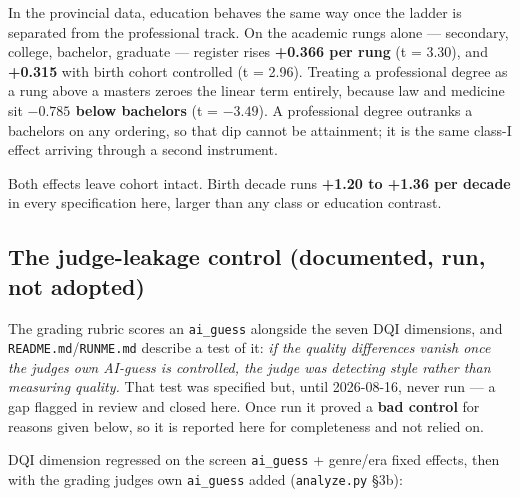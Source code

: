In the provincial data, education behaves the same way once the ladder is
separated from the professional track. On the academic rungs alone ---
secondary, college, bachelor, graduate --- register rises \textbf{+0.366 per rung}
(t = 3.30), and \textbf{+0.315} with birth cohort controlled (t = 2.96). Treating a
professional degree as a rung above a master\textquotesingle s zeroes the linear term entirely,
because law and medicine sit \textbf{\(-0.785\) below bachelor\textquotesingle s} (t = \(-3.49\)). A
professional degree outranks a bachelor\textquotesingle s on any ordering, so that dip cannot
be attainment; it is the same class-I effect arriving through a second
instrument.

Both effects leave cohort intact. Birth decade runs \textbf{+1.20 to +1.36 per
decade} in every specification here, larger than any class or education
contrast.

\subsection{The judge-leakage control (documented, run, not adopted)}\label{sec:judge-leakage}

The grading rubric scores an \texttt{ai\_guess} alongside the seven DQI dimensions,
and \texttt{README.md}/\texttt{RUNME.md} describe a test of it: \emph{if the quality differences
vanish once the judge\textquotesingle s own AI-guess is controlled, the judge was detecting
style rather than measuring quality.} That test was specified but, until 2026-08-16, never run --- a gap flagged in
review and closed here. Once run it proved a \textbf{bad control} for reasons given
below, so it is reported here for completeness and not relied on.

DQI dimension regressed on the screen \texttt{ai\_guess} + genre/era fixed effects,
then with the grading judge\textquotesingle s own \texttt{ai\_guess} added (\texttt{analyze.py} §3b):

